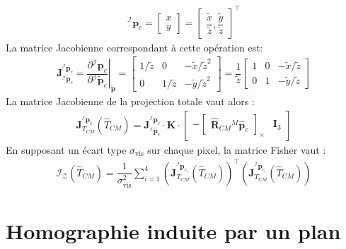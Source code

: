 \documentclass[a4paper]{article}
\begin{document}
\begin{align}
{}^{\mathcal{I}}\bm{p}_c = \begin{bmatrix} x \\ y \end{bmatrix} = \begin{bmatrix} 
\dfrac{\tilde{x}}{\tilde{z}}, \dfrac{\tilde{y}}{\tilde{z}} 
\end{bmatrix}^{\top}
\end{align}
La matrice Jacobienne correspondant à cette opération est:
\begin{align}
\bm{J}^{{}^{\mathcal{I}}\bm{p}_c}_{{}^{\mathcal{I}}\tilde{\bm{p}}_c} = \left. 
\dfrac{\partial{}^{\mathcal{I}}\bm{p}_c}{\partial{}^{\mathcal{I}}\tilde{\bm{p}}_c}\right|_{\tilde{\bm{p}}} =
\begin{bmatrix} 1/\tilde{z} & 0 & - \tilde{x}/\tilde{z}^2 \\ 0 & 1/\tilde{z} & 
-\tilde{y}/\tilde{z}^2 \end{bmatrix} =
\dfrac{1}{\tilde{z}} \begin{bmatrix} 1 & 0 & - \tilde{x}/\tilde{z} \\ 0 & 1 & 
- \tilde{y}/\tilde{z} \end{bmatrix}
\end{align}
La matrice Jacobienne de la projection totale vaut alors :
\begin{align}
\bm{J}^{{}^{\mathcal{I}}\bm{p}_c}_{T_{CM}}(\hat{T}_{CM}) =
\bm{J}^{{}^{\mathcal{I}}\bm{p}_c}_{{}^{\mathcal{I}}\tilde{\bm{p}}_c} \cdot
\bm{K} \cdot \begin{bmatrix} - \begin{bmatrix} \hat{\bm{R}}_{CM} {}^M\hat{\bm{p}}_c \end{bmatrix}_{\times}  & \bm{I}_3 \end{bmatrix}
\end{align}
En supposant un écart type $\sigma_{\text{vis}}$ sur chaque pixel, la matrice Fisher vaut :
\begin{align}
\boxed{\bm{\mathcal{I}}_{\mathcal{Z}}(\hat{T}_{CM}) = \dfrac{1}{\sigma_{\text{vis}}^2} \displaystyle\sum_{i=1}^4 
\left( \bm{J}^{{}^{\mathcal{I}}\bm{p}_{c_i}}_{T_{CM}}(\hat{T}_{CM}) \right)^{\top} 
\left( \bm{J}^{{}^{\mathcal{I}}\bm{p}_{c_i}}_{T_{CM}}(\hat{T}_{CM}) \right)}
\end{align}

\section{Homographie induite par un plan}
\end{document}
